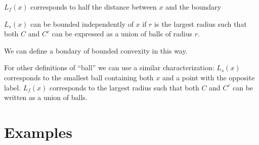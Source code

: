 \documentclass{article}
\begin{document}
  $L_f(x)$ corresponds to half the distance between $x$ and the boundary

  $L_s(x)$ can be bounded independently of $x$ if $r$ is the largest
  radius such that both $C$ and $C^c$ can be expressed as a union of
  balls of radius $r$.

  We can define a bondary of bounded convexity in this way.


 For other definitions of ``ball'' we can use a similar
 characterization: $L_s(x)$ corresponds to the smallest ball
 containing both $x$ and a point with the opposite label. $L_f(x)$
 corresponds to the largest radius such that both $C$ and $C^c$ can be
 written as a union of balls.
  
\section{Examples}
\end{document}

